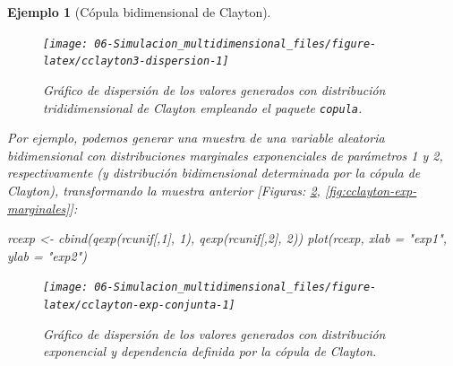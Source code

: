 \documentclass[
  10pt,
]{book}
\newenvironment{Shaded}{\begin{snugshade}}{\end{snugshade}}
\newcommand{\AttributeTok}[1]{\textcolor[rgb]{0.77,0.63,0.00}{#1}}
\newcommand{\DecValTok}[1]{\textcolor[rgb]{0.00,0.00,0.81}{#1}}
\newcommand{\FunctionTok}[1]{\textcolor[rgb]{0.00,0.00,0.00}{#1}}
\newcommand{\NormalTok}[1]{#1}
\newcommand{\OtherTok}[1]{\textcolor[rgb]{0.56,0.35,0.01}{#1}}
\newcommand{\StringTok}[1]{\textcolor[rgb]{0.31,0.60,0.02}{#1}}
\theoremstyle{break}
\newtheorem{example}{Ejemplo}[chapter]
\theoremstyle{nonumberplain}
\begin{document}
\begin{example}[Cópula bidimensional de Clayton]
\begin{figure}[!htbp]

{\centering \texttt{[image: 06-Simulacion\_multidimensional\_files/figure-latex/cclayton3-dispersion-1]} 

}

\caption{Gráfico de dispersión de los valores generados con distribución trididimensional de Clayton empleando el paquete \texttt{copula}.}\label{fig:cclayton3-dispersion}
\end{figure}

Por ejemplo, podemos generar una muestra de una variable aleatoria bidimensional con distribuciones marginales exponenciales de parámetros 1 y 2, respectivamente (y distribución bidimensional determinada por la cópula de Clayton), transformando la muestra anterior {[}Figuras: \ref{fig:cclayton-exp-conjunta}, \ref{fig:cclayton-exp-marginales}{]}:

\begin{Shaded}
\begin{Highlighting}[]
\NormalTok{rcexp }\OtherTok{\textless{}{-}} \FunctionTok{cbind}\NormalTok{(}\FunctionTok{qexp}\NormalTok{(rcunif[,}\DecValTok{1}\NormalTok{], }\DecValTok{1}\NormalTok{), }\FunctionTok{qexp}\NormalTok{(rcunif[,}\DecValTok{2}\NormalTok{], }\DecValTok{2}\NormalTok{))}
\FunctionTok{plot}\NormalTok{(rcexp, }\AttributeTok{xlab =} \StringTok{"exp1"}\NormalTok{, }\AttributeTok{ylab =} \StringTok{"exp2"}\NormalTok{)  }
\end{Highlighting}
\end{Shaded}

\begin{figure}[!htbp]

{\centering \texttt{[image: 06-Simulacion\_multidimensional\_files/figure-latex/cclayton-exp-conjunta-1]} 

}

\caption{Gráfico de dispersión de los valores generados con distribución exponencial y dependencia definida por la cópula de Clayton.}\label{fig:cclayton-exp-conjunta}
\end{figure}


\end{example}
\end{document}
